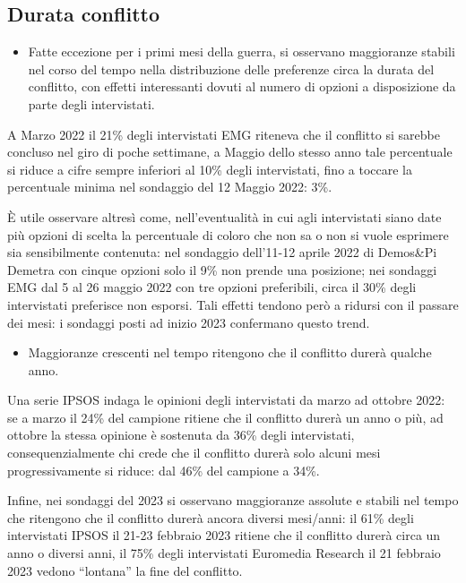 \documentclass[
  openany]{book}
\providecommand{\tightlist}{%
  \setlength{\itemsep}{0pt}\setlength{\parskip}{0pt}}
\begin{document}
\hypertarget{durata-conflitto}{%
\subsection{Durata conflitto}\label{durata-conflitto}}

\begin{itemize}
\tightlist
\item
  Fatte eccezione per i primi mesi della guerra, si osservano maggioranze stabili nel corso del tempo nella distribuzione delle preferenze circa la durata del conflitto, con effetti interessanti dovuti al numero di opzioni a disposizione da parte degli intervistati.
\end{itemize}

A Marzo 2022 il 21\% degli intervistati EMG riteneva che il conflitto si sarebbe concluso nel giro di poche settimane, a Maggio dello stesso anno tale percentuale si riduce a cifre sempre inferiori al 10\% degli intervistati, fino a toccare la percentuale minima nel sondaggio del 12 Maggio 2022: 3\%.

È utile osservare altresì come, nell'eventualità in cui agli intervistati siano date più opzioni di scelta la percentuale di coloro che non sa o non si vuole esprimere sia sensibilmente contenuta: nel sondaggio dell'11-12 aprile 2022 di Demos\&Pi Demetra con cinque opzioni solo il 9\% non prende una posizione; nei sondaggi EMG dal 5 al 26 maggio 2022 con tre opzioni preferibili, circa il 30\% degli intervistati preferisce non esporsi. Tali effetti tendono però a ridursi con il passare dei mesi: i sondaggi posti ad inizio 2023 confermano questo trend.

\begin{itemize}
\tightlist
\item
  Maggioranze crescenti nel tempo ritengono che il conflitto durerà qualche anno.
\end{itemize}

Una serie IPSOS indaga le opinioni degli intervistati da marzo ad ottobre 2022: se a marzo il 24\% del campione ritiene che il conflitto durerà un anno o più, ad ottobre la stessa opinione è sostenuta da 36\% degli intervistati, consequenzialmente chi crede che il conflitto durerà solo alcuni mesi progressivamente si riduce: dal 46\% del campione a 34\%.

Infine, nei sondaggi del 2023 si osservano maggioranze assolute e stabili nel tempo che ritengono che il conflitto durerà ancora diversi mesi/anni: il 61\% degli intervistati IPSOS il 21-23 febbraio 2023 ritiene che il conflitto durerà circa un anno o diversi anni, il 75\% degli intervistati Euromedia Research il 21 febbraio 2023 vedono ``lontana'' la fine del conflitto.
\end{document}
